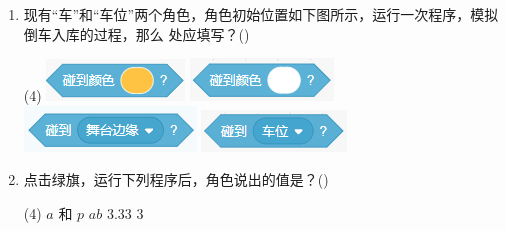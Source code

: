 \documentclass[10pt, a4paper]{article}
\newcommand{\hq}{\hfill(\qquad)}
\begin{document}
\begin{enumerate}
        \item 现有“车”和“车位”两个角色，角色初始位置如下图所示，运行一次程序，模拟倒车入库的过程，那么  处应填写？\hq
        \begin{tasks}(4)
            \task \includegraphics[width=.1\textwidth]{figure/10a.png}
            \task \includegraphics[width=.1\textwidth]{figure/10b.png}
            \task \includegraphics[width=.12\textwidth]{figure/10c.png}
            \task \includegraphics[width=.1\textwidth]{figure/10d.png}
        \end{tasks}

        \item 点击绿旗，运行下列程序后，角色说出的值是？\hq
        \begin{tasks}(4)
            \task $a$ 和 $p$
            \task $ab$
            \task $3.33$
            \task $3$
        \end{tasks}


\end{enumerate}
\end{document}
